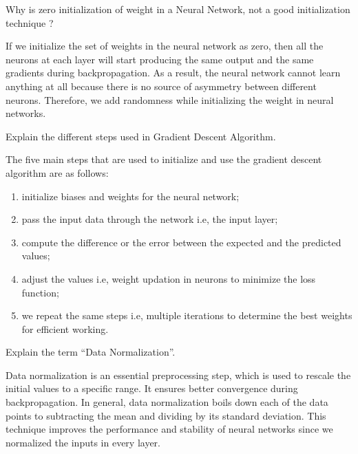 \documentclass[12pt,a4paper]{exam}
\begin{document}

\question
Why is zero initialization of weight in a Neural Network, not a good initialization technique ?
\fillwithlines{3cm}
\begin{solution}
If we initialize the set of weights in the neural network as zero, then all the neurons at each layer will start producing the same output and the same gradients during backpropagation.
As a result, the neural network cannot learn anything at all because there is no source of asymmetry between different neurons. Therefore, we add randomness while initializing the weight in neural networks.
\end{solution}


\question
Explain the different steps used in Gradient Descent Algorithm.
\fillwithlines{3cm}
\begin{solution}
The five main steps that are used to initialize and use the gradient descent algorithm are as follows:
\begin{enumerate}
\item initialize biases and weights for the neural network;
\item pass the input data through the network i.e, the input layer;
\item compute the difference or the error between the expected and the predicted values;
\item adjust the values i.e, weight updation in neurons to minimize the loss function;
\item we repeat the same steps i.e, multiple iterations to determine the best weights for efficient working.
\end{enumerate}
\end{solution}


\question
Explain the term “Data Normalization”.
\fillwithlines{3cm}
\begin{solution}
Data normalization is an essential preprocessing step, which is used to rescale the initial values to a specific range. It ensures better convergence during backpropagation.
In general, data normalization boils down each of the data points to subtracting the mean and dividing by its standard deviation. This technique improves the performance and stability of neural networks since we normalized the inputs in every layer.
\end{solution}
\end{document}
